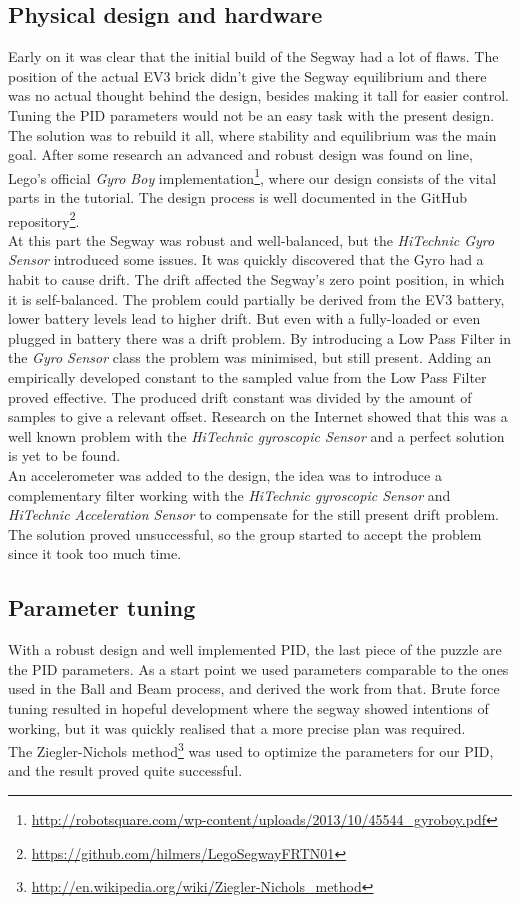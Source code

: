 \subsection{Physical design and hardware}
Early on it was clear that the initial build of the Segway had a lot of flaws. The position of the actual EV3 brick didn't give the Segway equilibrium and there was no actual thought behind the design, besides making it tall for easier control. Tuning the PID parameters would not be an easy task with the present design. The solution was to rebuild it all, where stability and equilibrium was the main goal. After some research an advanced and robust design was found on line, Lego's official {\it Gyro Boy} implementation\footnote{\url{http://robotsquare.com/wp-content/uploads/2013/10/45544_gyroboy.pdf}}, where our design consists of the vital parts in the tutorial. The design process is well documented in the GitHub repository\footnote{\url{https://github.com/hilmers/LegoSegwayFRTN01}}. 
\\[3ex]
At this part the Segway was robust and well-balanced, but the {\it HiTechnic Gyro Sensor} introduced some issues. It was quickly discovered that the Gyro had a habit to cause drift. The drift affected the Segway's zero point position, in which it is self-balanced. The problem could partially be derived from the EV3 battery, lower battery levels lead to higher drift. But even with a fully-loaded or even plugged in battery there was a drift problem. By introducing a Low Pass Filter in the {\it Gyro Sensor} class the problem was minimised, but still present. Adding an empirically developed constant to the sampled value from the Low Pass Filter proved effective. The produced drift constant was divided by the amount of samples to give a relevant offset. Research on the Internet showed that this was a well known problem with the {\it HiTechnic gyroscopic Sensor} and a perfect solution is yet to be found. 
\\[3ex]
An accelerometer was added to the design, the idea was to introduce a complementary filter working with the {\it HiTechnic gyroscopic Sensor} and {\it HiTechnic Acceleration Sensor} to compensate for the still present drift problem. The solution proved unsuccessful, so the group started to accept the problem since it took too much time.        

\subsection{Parameter tuning}
With a robust design and well implemented PID, the last piece of the puzzle are the PID parameters. As a start point we used parameters comparable to the ones used in the Ball and Beam process, and derived the work from that. Brute force tuning resulted in hopeful development where the segway showed intentions of working, but it was quickly realised that a more precise plan was required.
\\[3ex]
The Ziegler-Nichols method\footnote{\url{http://en.wikipedia.org/wiki/Ziegler-Nichols_method}} was used to optimize the parameters for our PID, and the result proved quite successful. 

